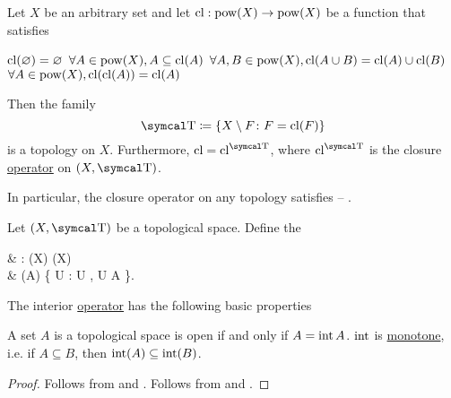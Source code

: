 \begin{proposition}\label{thm:closure_operator_axioms}
  Let \( X \) be an arbitrary set and let \( \operatorname{cl}: \operatorname{pow}(X) \to \operatorname{pow}(X) \) be a function that satisfies
  \begin{PropEnum}
     \( \operatorname{cl}(\varnothing) = \varnothing \)
     \( \forall A \in \operatorname{pow}(X), A \subseteq \operatorname{cl}(A) \)
     \( \forall A, B \in \operatorname{pow}(X), \operatorname{cl}(A \cup B) = \operatorname{cl}(A) \cup \operatorname{cl}(B) \)
     \( \forall A \in \operatorname{pow}(X), \operatorname{cl}(\operatorname{cl}(A)) = \operatorname{cl}(A) \)
  \end{PropEnum}

  Then the family
  \begin{equation*}
    \CT \coloneqq \{ X \setminus F \colon F = \Cl(F) \}
  \end{equation*}
  is a topology on \( X \). Furthermore, \( \Cl = \Cl^{\CT} \), where \( \Cl^{\CT} \) is the closure \hyperref[def:closure_operator]{operator} on \( (X, \CT) \).

  In particular, the closure operator on any topology satisfies  -- .
\end{proposition}

\begin{definition}\label{def:interior_operator}
  Let \( (X, \CT) \) be a topological space. Define the 
  \begin{BreakableAlign*}
     & \Int: \Pow(X) \to \Pow(X)                                     \\
     & \Int(A) \coloneqq \bigcup \{ U : U \in \CT, U \subseteq A \}.
  \end{BreakableAlign*}
\end{definition}

\begin{proposition}\label{thm:interior_operator_properties}
  The interior \hyperref[def:interior_operator]{operator} has the following basic properties
  \begin{PropEnum}
     A set \( A \) is a topological space is open if and only if \( A = \operatorname{int} A \).
     \( \operatorname{int} \) is \hyperref[def:monotone_map]{monotone}, i.e. if \( A \subseteq B \), then \( \operatorname{int}(A) \subseteq \operatorname{int}(B) \).
  \end{PropEnum}
\end{proposition}
\begin{proof}
   Follows from  and .
   Follows from  and .
\end{proof}

